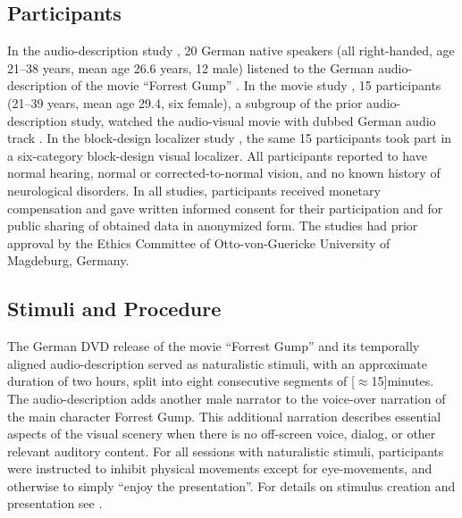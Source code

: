 \documentclass[english,11pt]{article}
\begin{document}
\subsection*{Participants}
In the audio-description study \citep{hanke2014audiomovie}, 20 German native
speakers (all right-handed, age 21–38 years, mean age 26.6 years, 12 male)
listened to the German audio-description \citep{ForrestGumpGermanAD} of the
movie ``Forrest Gump'' \citep{ForrestGumpMovie}.
In the movie study \citep{hanke2016simultaneous}, 15 participants (21–39 years,
mean age 29.4, six female), a subgroup of the prior audio-description study,
watched the audio-visual movie with dubbed German audio track
\citep{ForrestGumpDVD}.
In the block-design localizer study \citep{sengupta2016extension}, the same 15
participants took part in a six-category block-design visual localizer.
All participants reported to have normal hearing, normal or corrected-to-normal
vision, and no known history of neurological disorders.
In all studies, participants received monetary compensation and gave written
informed consent for their participation and for public sharing of obtained data
in anonymized form. The studies had prior approval by the Ethics Committee of
Otto-von-Guericke University of Magdeburg, Germany.


\subsection*{Stimuli and Procedure}

The German DVD release \citep{ForrestGumpDVD} of the movie ``Forrest Gump''
\citep{ForrestGumpMovie} and its temporally aligned audio-description
\citep{ForrestGumpGermanAD} served as naturalistic stimuli, with an approximate
duration of two hours, split into eight consecutive segments of
\unit[$\approx$15]{minutes}.
The audio-description adds another male narrator to the voice-over narration of
the main character Forrest Gump. This additional narration describes essential
aspects of the visual scenery when there is no off-screen voice, dialog, or
other relevant auditory content.
For all sessions with naturalistic stimuli, participants were instructed to
inhibit physical movements except for eye-movements, and otherwise to simply
``enjoy the presentation''.
%
For details on stimulus creation and presentation see
\citet{hanke2014audiomovie, hanke2016simultaneous}.
\end{document}
